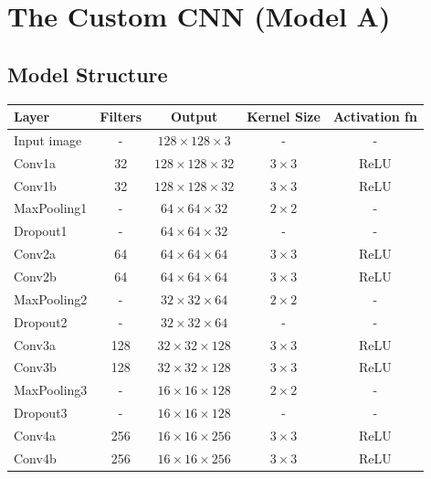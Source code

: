 \documentclass[11pt,a4paper]{article}
\begin{document}
\section{The Custom CNN (Model A)} %

\subsection{Model Structure}

\begin{table}[h!]
\centering
\renewcommand{\arraystretch}{1.15}
\begin{tabular}{||l|c|c|c|c||}
 \hline
 Layer & Filters & Output & Kernel Size & Activation fn \\ [0.5ex]
 \hline\hline
 Input image        & -    & $128 \times 128 \times 3$   & -          & -      \\
 \hline
 Conv1a             & 32   & $128 \times 128 \times 32$  & $3 \times 3$ & ReLU  \\
 Conv1b             & 32   & $128 \times 128 \times 32$  & $3 \times 3$ & ReLU  \\
 MaxPooling1        & -    & $64 \times 64 \times 32$    & $2 \times 2$ & -     \\
 Dropout1           & -    & $64 \times 64 \times 32$    & -          & -      \\
 \hline
 Conv2a             & 64   & $64 \times 64 \times 64$    & $3 \times 3$ & ReLU  \\
 Conv2b             & 64   & $64 \times 64 \times 64$    & $3 \times 3$ & ReLU  \\
 MaxPooling2        & -    & $32 \times 32 \times 64$    & $2 \times 2$ & -     \\
 Dropout2           & -    & $32 \times 32 \times 64$    & -          & -      \\
 \hline
 Conv3a             & 128  & $32 \times 32 \times 128$   & $3 \times 3$ & ReLU  \\
 Conv3b             & 128  & $32 \times 32 \times 128$   & $3 \times 3$ & ReLU  \\
 MaxPooling3        & -    & $16 \times 16 \times 128$   & $2 \times 2$ & -     \\
 Dropout3           & -    & $16 \times 16 \times 128$   & -          & -      \\
 \hline
 Conv4a             & 256  & $16 \times 16 \times 256$   & $3 \times 3$ & ReLU  \\
 Conv4b             & 256  & $16 \times 16 \times 256$   & $3 \times 3$ & ReLU  \\

\end{tabular}
\end{table}
\end{document}

